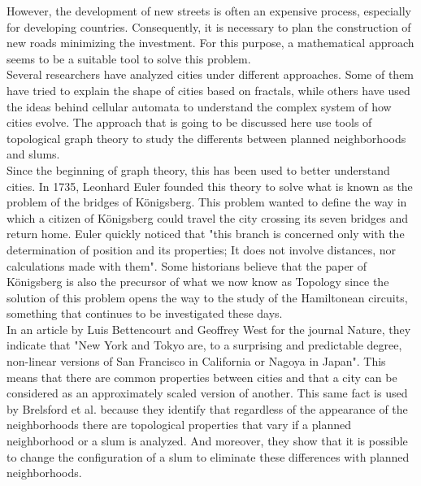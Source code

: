 \documentclass[10pt]{article}
\begin{document}
However, the development of new streets is often an expensive process, especially for developing countries. Consequently, it is necessary to plan the construction of new roads minimizing the investment. For this purpose, a mathematical approach seems to be a suitable tool to solve this problem\cite{bre}.\\

Several researchers have analyzed cities under different approaches. Some of them have tried to explain the shape of cities based on fractals, while others have used the ideas behind cellular automata to understand the complex system of how cities evolve\cite{d2019mathematics}. The approach that is going to be discussed here use tools of topological graph theory to study the differents between planned neighborhoods and slums\cite{bre}.\\

Since the beginning of graph theory, this has been used to better understand cities. In 1735, Leonhard Euler founded this theory to solve what is known as the problem of the bridges of K\"{o}nigsberg\cite{alexanderson2006cover}. This problem wanted to define the way in which a citizen of K\"{o}nigsberg could travel the city crossing its seven bridges and return home. Euler quickly noticed that "this branch is concerned only with the determination of position and its properties; It does not involve distances, nor calculations made with them"\cite{alexanderson2006cover}. Some historians believe that the paper of K\"{o}nigsberg is also the precursor of what we now know as Topology since the solution of this problem opens the way to the study of the Hamiltonean circuits, something that continues to be investigated these days\cite{alexanderson2006cover}.\\

In an article by Luis Bettencourt and Geoffrey West for the journal Nature, they indicate that "New York and Tokyo are, to a surprising and predictable degree, non-linear versions of San Francisco in California or Nagoya in Japan"\cite{bettencourt2010unified}. This means that there are common properties between cities and that a city can be considered as an approximately scaled version of another. This same fact is used by  Brelsford et al. because they identify that regardless of the appearance of the neighborhoods there are topological properties that vary if a planned neighborhood or a slum is analyzed\cite{bre}. And moreover, they show that it is possible to change the configuration of a slum to eliminate these differences with planned neighborhoods\cite{bre}.\\
\end{document}
